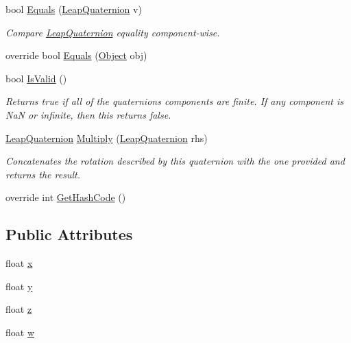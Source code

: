 \begin{DoxyCompactItemize}
bool \mbox{\hyperlink{struct_leap_1_1_leap_quaternion_a4e008c0a92d4d45557f1fadbf136ccd0}{Equals}} (\mbox{\hyperlink{struct_leap_1_1_leap_quaternion}{Leap\+Quaternion}} v)
\begin{DoxyCompactList}\small\item\em Compare \mbox{\hyperlink{struct_leap_1_1_leap_quaternion}{Leap\+Quaternion}} equality component-\/wise. \end{DoxyCompactList}\item 
override bool \mbox{\hyperlink{struct_leap_1_1_leap_quaternion_afae1a5af67b2bea73971c21ce5bb2b3f}{Equals}} (\mbox{\hyperlink{_t_m_pro___font_asset_creator_window_8cs_aef19bab18b9814edeef255c43e4f6bbc}{Object}} obj)
\item 
bool \mbox{\hyperlink{struct_leap_1_1_leap_quaternion_ad55818738b16d017e907cb9ac9fc975f}{Is\+Valid}} ()
\begin{DoxyCompactList}\small\item\em Returns true if all of the quaternion\textquotesingle{}s components are finite. If any component is NaN or infinite, then this returns false. \end{DoxyCompactList}\item 
\mbox{\hyperlink{struct_leap_1_1_leap_quaternion}{Leap\+Quaternion}} \mbox{\hyperlink{struct_leap_1_1_leap_quaternion_a19295cb26ceaa4f798ee093af641c1de}{Multiply}} (\mbox{\hyperlink{struct_leap_1_1_leap_quaternion}{Leap\+Quaternion}} rhs)
\begin{DoxyCompactList}\small\item\em Concatenates the rotation described by this quaternion with the one provided and returns the result. \end{DoxyCompactList}\item 
override int \mbox{\hyperlink{struct_leap_1_1_leap_quaternion_afef4eb69b6fb088f513d8ea9d45331e5}{Get\+Hash\+Code}} ()
\end{DoxyCompactItemize}
\subsection*{Public Attributes}
\begin{DoxyCompactItemize}
\item 
float \mbox{\hyperlink{struct_leap_1_1_leap_quaternion_a59fb70e8250b55c3a1ceb17f3ecfc4ff}{x}}
\item 
float \mbox{\hyperlink{struct_leap_1_1_leap_quaternion_abbf57cb8408118a670c43e4713bf86ff}{y}}
\item 
float \mbox{\hyperlink{struct_leap_1_1_leap_quaternion_a518972acd244231b413504c2d441445f}{z}}
\item 
float \mbox{\hyperlink{struct_leap_1_1_leap_quaternion_a81a812c8073171912309baabca03146f}{w}}
\end{DoxyCompactItemize}
